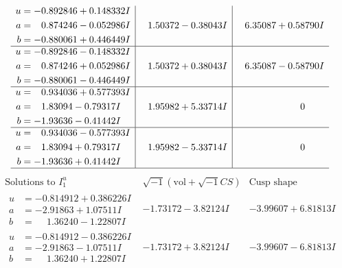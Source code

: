\documentclass[1p]{elsarticle_modified}
\theoremstyle{definition}
\newcommand{\I}{\sqrt{-1}}
\begin{document}
$$\begin{array}{c|c|c}
\begin{aligned}
u &= -0.892846 + 0.148332 I \\
a &= \phantom{-}0.874246 - 0.052986 I \\
b &= -0.880061 + 0.446449 I\end{aligned}
 & \phantom{-}1.50372 - 0.38043 I & \phantom{-}6.35087 + 0.58790 I \\ \hline\begin{aligned}
u &= -0.892846 - 0.148332 I \\
a &= \phantom{-}0.874246 + 0.052986 I \\
b &= -0.880061 - 0.446449 I\end{aligned}
 & \phantom{-}1.50372 + 0.38043 I & \phantom{-}6.35087 - 0.58790 I \\ \hline\begin{aligned}
u &= \phantom{-}0.934036 + 0.577393 I \\
a &= \phantom{-}1.83094 - 0.79317 I \\
b &= -1.93636 - 0.41442 I\end{aligned}
 & \phantom{-}1.95982 + 5.33714 I & \phantom{-0.000000 } 0 \\ \hline\begin{aligned}
u &= \phantom{-}0.934036 - 0.577393 I \\
a &= \phantom{-}1.83094 + 0.79317 I \\
b &= -1.93636 + 0.41442 I\end{aligned}
 & \phantom{-}1.95982 - 5.33714 I & \phantom{-0.000000 } 0\\
 \hline 
 \end{array}$$\newpage$$\begin{array}{c|c|c}  
\text{Solutions to }I^u_{1}& \I (\text{vol} + \sqrt{-1}CS) & \text{Cusp shape}\\
 \hline 
\begin{aligned}
u &= -0.814912 + 0.386226 I \\
a &= -2.91863 + 1.07511 I \\
b &= \phantom{-}1.36240 - 1.22807 I\end{aligned}
 & -1.73172 - 3.82124 I & -3.99607 + 6.81813 I \\ \hline\begin{aligned}
u &= -0.814912 - 0.386226 I \\
a &= -2.91863 - 1.07511 I \\
b &= \phantom{-}1.36240 + 1.22807 I\end{aligned}
 & -1.73172 + 3.82124 I & -3.99607 - 6.81813 I \\ \hline\begin{aligned}

\end{aligned}
\end{array}$$
\end{document}
